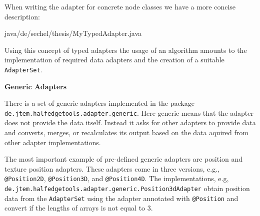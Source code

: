 \documentclass[Thesis.tex]{subfiles}
\begin{document}
When writing the adapter for concrete node classes we have a more concise description:

 {java/de/sechel/thesis/MyTypedAdapter.java}

Using this concept of typed adapters the usage of an algorithm amounts to the implementation of
required data adapters and the creation of a suitable {\tt AdapterSet}.



{\bf Generic Adapters}

There is a set of generic adapters implemented in the package 
{\tt de.jtem.half\-edge\-tools.adap\-ter.generic}. Here generic means that the adapter does not provide
the data itself. Instead it asks for other adapters to provide data and converts, merges, or recalculates its
output based on the data aquired from other adapter implementations.

The most important example of pre-defined generic adapters are position and texture position adapters.
These adapters come in three versions, e.g., {\tt @Position2D}, {\tt @Position3D}, and {\tt @Position4D}. The implementations, e.g, {\tt de.jtem.half\-edge\-tools.adapter.generic.Position\-3dAdapter} obtain position
data from the {\tt AdapterSet} using the adapter annotated with {\tt @Position} and convert if the lengths
of arrays is not equal to $3$.
\end{document}
